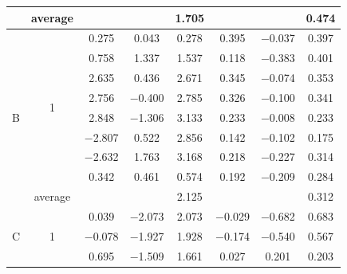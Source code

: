 \documentclass[remotesensing,article,accept,moreauthors,pdftex,10pt,a4paper]{mdpi}
\theoremstyle{mdpi}
\begin{document}
\begin{table}[H]
\begin{tabular}{cccccccc}
\cline{2-8}          & average &       &       & \multicolumn{1}{c}{1.705} &       &       & \multicolumn{1}{c}{0.474} \\
    \hline
    \multirow{9}[4]{*}{B} & \multirow{8}[2]{*}{1} & \multicolumn{1}{c}{0.275} & \multicolumn{1}{c}{0.043} & \multicolumn{1}{c}{0.278} & \multicolumn{1}{c}{0.395} & \multicolumn{1}{c}{$-$0.037} & \multicolumn{1}{c}{0.397} \\
          &       & \multicolumn{1}{c}{0.758} & \multicolumn{1}{c}{1.337} & \multicolumn{1}{c}{1.537} & \multicolumn{1}{c}{0.118} & \multicolumn{1}{c}{$-$0.383} & \multicolumn{1}{c}{0.401} \\
          &       & \multicolumn{1}{c}{2.635} & \multicolumn{1}{c}{0.436} & \multicolumn{1}{c}{2.671} & \multicolumn{1}{c}{0.345} & \multicolumn{1}{c}{$-$0.074} & \multicolumn{1}{c}{0.353} \\
          &       & \multicolumn{1}{c}{2.756} & \multicolumn{1}{c}{$-$0.400} & \multicolumn{1}{c}{2.785} & \multicolumn{1}{c}{0.326} & \multicolumn{1}{c}{$-$0.100} & \multicolumn{1}{c}{0.341} \\
          &       & \multicolumn{1}{c}{2.848} & \multicolumn{1}{c}{$-$1.306} & \multicolumn{1}{c}{3.133} & \multicolumn{1}{c}{0.233} & \multicolumn{1}{c}{$-$0.008} & \multicolumn{1}{c}{0.233} \\
          &       & \multicolumn{1}{c}{$-$2.807} & \multicolumn{1}{c}{0.522} & \multicolumn{1}{c}{2.856} & \multicolumn{1}{c}{0.142} & \multicolumn{1}{c}{$-$0.102} & \multicolumn{1}{c}{0.175} \\
          &       & \multicolumn{1}{c}{$-$2.632} & \multicolumn{1}{c}{1.763} & \multicolumn{1}{c}{3.168} & \multicolumn{1}{c}{0.218} & \multicolumn{1}{c}{$-$0.227} & \multicolumn{1}{c}{0.314} \\
          &       & \multicolumn{1}{c}{0.342} & \multicolumn{1}{c}{0.461} & \multicolumn{1}{c}{0.574} & \multicolumn{1}{c}{0.192} & \multicolumn{1}{c}{$-$0.209} & \multicolumn{1}{c}{0.284} \\
\cline{2-8}          & average &       &       & \multicolumn{1}{c}{2.125} &       &       & \multicolumn{1}{c}{0.312} \\
    \hline
    \multirow{14}[14]{*}{\vspace{24pt}C} & \multirow{3}[1]{*}{1} & 0.039 & $-$2.073 & 2.073 & $-$0.029 & $-$0.682 & 0.683 \\
          &       & $-$0.078 & $-$1.927 & 1.928 & $-$0.174 & $-$0.540 & 0.567 \\
          &       & 0.695 & $-$1.509 & 1.661 & 0.027 & 0.201 & 0.203 \\

\end{tabular}
\end{table}
\end{document}
